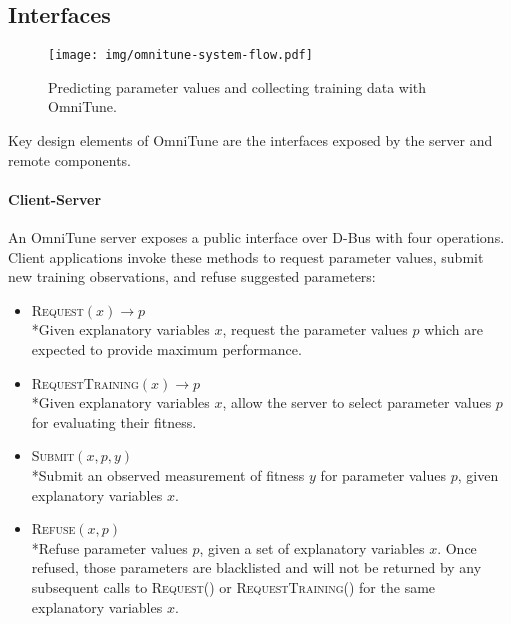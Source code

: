   \subsection{Interfaces}

  \begin{figure}
    \centering
    \texttt{[image: img/omnitune-system-flow.pdf]}
    \caption{%
    Predicting parameter values and collecting training data with
    OmniTune.%
    }
    \label{fig:omnitune-system-flow}
  \end{figure}

  Key design elements of OmniTune are the interfaces exposed by the
  server and remote components.

  \paragraph{Client-Server} An OmniTune server exposes a public
  interface over D-Bus with four operations. Client applications invoke
  these methods to request parameter values, submit new training
  observations, and refuse suggested parameters:
  \begin{itemize}
    \item \textsc{Request}$(x) \to p$\\*Given explanatory variables $x$,
    request the parameter values $p$ which are expected to provide
    maximum performance.
    \item \textsc{RequestTraining}$(x) \to p$\\*Given explanatory
    variables $x$, allow the server to select parameter values $p$ for
    evaluating their fitness.
    \item \textsc{Submit}$(x, p, y)$\\*Submit an observed measurement of
    fitness $y$ for parameter values $p$, given explanatory variables
    $x$.
    \item \textsc{Refuse}$(x, p)$\\*Refuse parameter values $p$, given a
    set of explanatory variables $x$. Once refused, those parameters are
    blacklisted and will not be returned by any subsequent calls to
    \textsc{Request()} or \textsc{RequestTraining()} for the same
    explanatory variables $x$.
  \end{itemize}

